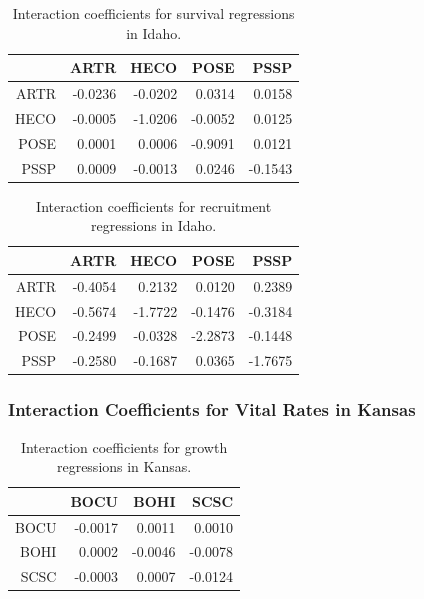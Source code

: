 \documentclass[12pt,]{article}
\begin{document}
\begin{table}[ht]
\centering
\caption{Interaction coefficients for survival regressions in Idaho.} 
\begin{tabular}{rrrrr}
  \hline
 & ARTR & HECO & POSE & PSSP \\ 
  \hline
ARTR & -0.0236 & -0.0202 & 0.0314 & 0.0158 \\ 
  HECO & -0.0005 & -1.0206 & -0.0052 & 0.0125 \\ 
  POSE & 0.0001 & 0.0006 & -0.9091 & 0.0121 \\ 
  PSSP & 0.0009 & -0.0013 & 0.0246 & -0.1543 \\ 
   \hline
\end{tabular}
\end{table}

\begin{table}[ht]
\centering
\caption{Interaction coefficients for recruitment regressions in Idaho.} 
\begin{tabular}{rrrrr}
  \hline
 & ARTR & HECO & POSE & PSSP \\ 
  \hline
ARTR & -0.4054 & 0.2132 & 0.0120 & 0.2389 \\ 
  HECO & -0.5674 & -1.7722 & -0.1476 & -0.3184 \\ 
  POSE & -0.2499 & -0.0328 & -2.2873 & -0.1448 \\ 
  PSSP & -0.2580 & -0.1687 & 0.0365 & -1.7675 \\ 
   \hline
\end{tabular}
\end{table}


\newpage{}

\subsubsection{Interaction Coefficients for Vital Rates in Kansas}

\begin{table}[ht]
\centering
\caption{Interaction coefficients for growth regressions in Kansas.} 
\begin{tabular}{rrrr}
  \hline
 & BOCU & BOHI & SCSC \\ 
  \hline
BOCU & -0.0017 & 0.0011 & 0.0010 \\ 
  BOHI & 0.0002 & -0.0046 & -0.0078 \\ 
  SCSC & -0.0003 & 0.0007 & -0.0124 \\ 
   \hline
\end{tabular}
\end{table}
\end{document}
